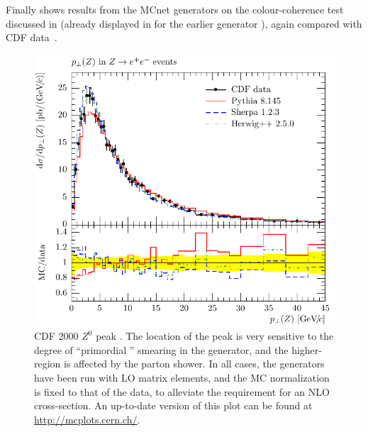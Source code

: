 Finally  shows results from
the MCnet generators on the colour-coherence test discussed in
 (already displayed in
 for the earlier generator \pythiasix),
again compared with CDF data~\cite{Abe:1994nj}.

\begin{figure}[tp]
  \centering
  \includegraphics[scale=0.7]{mc-plots/CDF_2000_S4155203-cmp/CDF_2000_S4155203_d01-x01-y01}
  \caption{CDF 2000 $Z^0$ \pT peak \cite{Affolder:1999jh}.  The location
    of the peak is very sensitive to the degree of ``primordial \kT''
    smearing in the generator, and the higher-\pT region is affected by
    the parton shower. In all cases, the generators have been run with
    LO matrix elements, and the MC normalization is fixed to that of the
    data, to alleviate the requirement for an NLO cross-section.  An
    up-to-date version of this plot can be found at
    \url{http://mcplots.cern.ch/}.}
  \label{fig:cmp:intrinsic-kt}
\end{figure}

